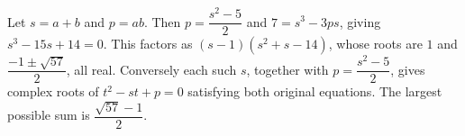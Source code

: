 Let $s=a+b$ and $p=ab$. Then $p=\dfrac{s^2-5}{2}$ and $7=s^3-3ps$, giving $s^3-15s+14=0$. This factors as $(s-1)(s^2+s-14)$, whose roots are $1$ and $\dfrac{-1\pm\sqrt{57}}{2}$, all real. Conversely each such $s$, together with $p=\dfrac{s^2-5}{2}$, gives complex roots of $t^2-st+p=0$ satisfying both original equations. The largest possible sum is $\boxed{\dfrac{\sqrt{57}-1}{2}}$.
